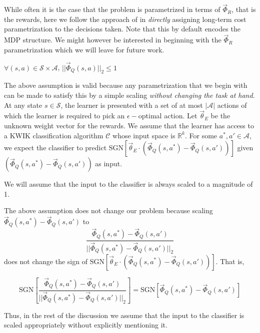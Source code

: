 While often it is the case that the problem is parametrized in terms of $\vec{\Phi}_R$, that is the rewards, here we follow the approach of \citet{DBLP:conf/icra/SilverBS12} in \textit{directly} assigning long-term cost parametrization to the decisions taken. Note that this by default encodes the MDP structure. We might however be interested in beginning with the $\vec{\Phi}_R$ parametrization which we will leave for future work. \\

\begin{assumption}
$\forall (s,a) \in \mathcal{S} \times \mathcal{A}$,  $||\vec{\Phi}_Q(s,a)||_2 \leq 1$  
\end{assumption}

The above assumption is valid because any parametrization that we begin with can be made to satisfy this by a simple scaling \textit{without  changing the task at hand}.\\


At any state $s \in \mathcal{S}$, the learner is presented with a set of at most $|\mathcal{A}|$ actions of which the learner is required to pick an $\epsilon-$optimal action. Let $\vec{\theta}_E$ be the unknown weight vector for the rewards.  We assume that the learner has access to a KWIK classification algorithm $\mathcal{C}$ whose input space is $\mathbb{R}^k$. For some $a^*,a' \in \mathcal{A}$, we expect the classifier to predict $\text{SGN}[\vec{\theta}_E \cdot(\vec{\Phi}_Q(s,a^*) - \vec{\Phi}_Q(s,a'))]$ given $(\vec{\Phi}_Q(s,a^*) - \vec{\Phi}_Q(s,a'))$ as input. 

\begin{assumption}
We will assume that the input to the classifier is always scaled to a magnitude of 1. 
\end{assumption}

The above assumption does not change our problem because scaling $\vec{\Phi}_Q(s,a^*) - \vec{\Phi}_Q(s,a')$ to \[\frac{\vec{\Phi}_Q(s,a^*) - \vec{\Phi}_Q(s,a')}{||\vec{\Phi}_Q(s,a^*) - \vec{\Phi}_Q(s,a') ||_2}\]
does not change the sign of $\text{SGN}[\vec{\theta}_E \cdot(\vec{\Phi}_Q(s,a^*) - \vec{\Phi}_Q(s,a'))]$.
That is,

\[
\text{SGN} \left[ \frac{\vec{\Phi}_Q(s,a^*) - \vec{\Phi}_Q(s,a')}{||\vec{\Phi}_Q(s,a^*) - \vec{\Phi}_Q(s,a') ||_2}\right]
=\text{SGN} \left[\vec{\Phi}_Q(s,a^*) - \vec{\Phi}_Q(s,a') \right] 
\]

 Thus, in the rest of the discussion we assume that the input to the classifier is scaled appropriately without explicitly mentioning it. \\
 
